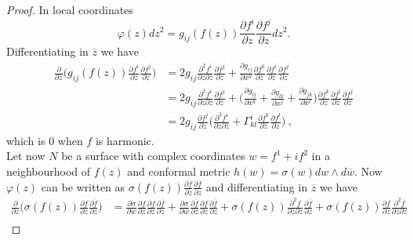 \begin{proof}
    In local coordinates
    \[
        \varphi(z)dz^2 = g_{ij}(f(z)) \frac{\partial f^i}{\partial z}  \frac{\partial f^j}{\partial z} dz^2. 
    \]
    Differentiating in $\overline{z}$ we have
    \[
    \begin{split}
       \frac{ \partial}{\partial \overline{z}} \Big(g_{ij}(f(z)) \frac{\partial f^i}{\partial z}  \frac{\partial f^j}{\partial z} \Big) & = 2 g_{ij} \frac{\partial^2 f^i}{\partial z \partial \overline{z}} \frac{\partial f^j}{\partial z} + \frac{\partial g_{ij}}{\partial x^k} \frac{\partial f^k}{\partial \overline{z}} \frac{\partial f^i}{\partial z} \frac{\partial f^j}{\partial z} \\
       & = 2 g_{ij} \frac{\partial^2 f^i}{\partial z \partial \overline{z}} \frac{\partial f^j}{\partial z} + \Big(\frac{\partial g_{lj}}{\partial x^k} + \frac{\partial g_{lk}}{\partial x^j} + \frac{\partial g_{jk}}{\partial x^l} \Big) \frac{\partial f^k}{\partial \overline{z}} \frac{\partial f^l}{\partial z} \frac{\partial f^j}{\partial z}  \\
       & = 2 g_{ij} \frac{\partial f^j}{\partial z} \Big( \frac{\partial^2 f^i}{\partial z \partial \overline{z}} + \Gamma^i_{kl}  \frac{\partial f^k}{\partial \overline{z}} \frac{\partial f^l}{\partial z} \Big) \ ,
    \end{split}
    \]
    which is $0$ when $f$ is harmonic.\\
    Let now $N$ be a surface with complex coordinates $w = f^1 + if^2$ in a neighbourhood of $f(z)$ and conformal metric $h(w) = \sigma(w) dw \wedge d\overline{w}$. Now $\varphi(z)$ can be written as $\sigma(f(z)) \frac{\partial f}{ \partial z} \frac{\partial \overline{f}}{\partial z}$ and differentiating in $\overline{z}$ we have
    \[
    \begin{split}
        \frac{ \partial}{\partial \overline{z}}\Big(\sigma(f(z)) \frac{\partial f}{ \partial z}  \frac{\partial \overline{f}}{\partial z} \Big) & = 
        \frac{\partial \sigma}{\partial w} \frac{\partial f}{\partial \overline{z}} \frac{\partial f}{ \partial z} \frac{\partial \overline{f}}{\partial z} +
        \frac{\partial \sigma}{\partial \overline{w}} \frac{\partial \overline{f}}{\partial \overline{z}} \frac{\partial f}{ \partial z} \frac{\partial \overline{f}}{\partial z} +
        \sigma(f(z)) \frac{\partial^2 f}{\partial \overline{z} \partial z} \frac{\partial \overline{f}}{\partial z} +
        \sigma(f(z)) \frac{\partial f}{ \partial z} \frac{\partial^2 \overline{f}}{\partial \overline{z} \partial z} \\

\end{split}\]
\end{proof}
